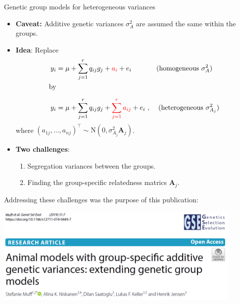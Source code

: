 \documentclass[10pt,ignorenonframetext,]{beamer}
\providecommand{\tightlist}{%
  \setlength{\itemsep}{0pt}\setlength{\parskip}{0pt}}
\begin{document}
\begin{frame}

\begin{block}{Genetic group models for heterogeneous variances}

\vspace{3mm}

\begin{itemize}
\item
  \textbf{Caveat:} Additive genetic variances \(\sigma_A^2\) are assumed
  the same within the groups. \vspace{4mm}
\item
  \textbf{Idea}: Replace \begin{align*}
   y_i &= \mu + \sum_{j=1}^r q_{ij}g_j + \textcolor{red}{a_i}  +  e_i & (\text{homogeneous } \sigma_A^2) \quad\\ 
  \text{by} \\[2mm]
  y_i &= \mu + \sum_{j=1}^r q_{ij}g_j + \textcolor{red}{\sum_{j=1}^r a_{ij}}  +  e_i \ , & (\text{heterogeneous }  \sigma_{A_j}^2)  
  \end{align*} where
  \((a_{1j}, \ldots, a_{nj})^\top \sim \text{N}(0, \sigma_{A_j}^2 \mathbf{A}_j)\).
  \vspace{4mm}
\item
  \textbf{Two challenges}:

  \begin{enumerate}
  [1)]
  \tightlist
  \item
    Segregation variances between the groups.
  \item
    Finding the group-specific relatedness matrics \(\mathbf{A}_j\).
  \end{enumerate}
\end{itemize}

\end{block}

\end{frame}

\begin{frame}

Addressing these challenges was the purpose of this publication:

\center

\includegraphics[width=0.9\textwidth,height=\textheight]{graphics/GSE_paper.png}

\end{frame}
\end{document}
